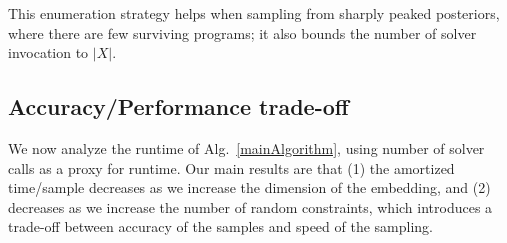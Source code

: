 \documentclass{article}
\begin{document}
  This enumeration strategy helps when sampling from sharply peaked posteriors,
  where there are few surviving programs; it also bounds the number of solver invocation to $|X|$.

  

  \subsection{Accuracy/Performance trade-off}
  We now analyze the runtime of Alg.~\ref{mainAlgorithm},
  using number of solver calls as a proxy for runtime.
  Our main results are that (1) the amortized time/sample decreases as we increase the dimension of the embedding,
  and (2) decreases as we increase the number of random constraints,
  which introduces a trade-off between accuracy of the samples and speed of the sampling.
\end{document}
